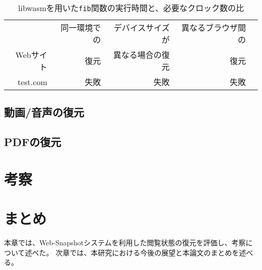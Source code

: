 \begin{table}[htbp]
  \caption{libwasmを用いた{\tt fib}関数の実行時間と、必要なクロック数の比}
  \label{tab:fib_time}
  \begin{center}
    \begin{tabular}{rrrrr}
      \hline
      & 同一環境での & デバイスサイズが & 異なるブラウザ間の \\
       Webサイト & 復元 & 異なる場合の復元 & 復元 \\ \hline \hline
      test.com & 失敗 & 失敗 &  失敗 \\ \hline
    \end{tabular}
  \end{center}
\end{table}

\subsection{動画/音声の復元}

\subsection{PDFの復元}

\section{考察}

\section{まとめ}
本章では、Web-Snapshotシステムを利用した閲覧状態の復元を評価し、考察について述べた。
次章では、本研究における今後の展望と本論文のまとめを述べる。